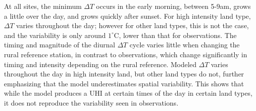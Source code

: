 At all sites,%
the minimum $\Delta T$ occurs in the early morning, between 5-9am, grows a little over the day, and grows quickly after sunset. %
For high intensity land type, $\Delta T$ varies throughout the day; however for other land types, this is not the case, and the variability is only around $1^\circ$C, lower than that for observations.  
The timing and magnitude of the diurnal $\Delta T$ cycle varies little when changing the rural reference station, in contrast to observations, which change significantly in timing and intensity depending on the rural reference. 
Modeled $\Delta T$ varies throughout the day in high intensity land, but other land types do not, further emphasizing that the model underestimates spatial variability.  
This shows that while the model produces a UHI at certain times of the day in certain land types, it does not reproduce the variability seen in observations.

